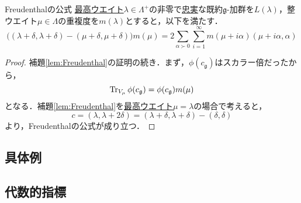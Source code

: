 \documentclass[rep_main]{subfiles}
\begin{document}
\begin{mytheo}[label=thm:Freudenthal]{Freudenthalの公式}
	\hyperref[def:highest-weight-module]{最高ウエイト}$\lambda \in \Lambda^+$の非零で\hyperref[def:faithful]{忠実}な既約$\mathfrak{g}$-加群を$L(\lambda)$，整ウエイト$\mu \in \Lambda$の重複度を$m(\lambda)$とすると，以下を満たす．
	\begin{equation}
		\big((\lambda + \delta, \lambda + \delta) - (\mu + \delta, \mu + \delta)\big)m(\mu) = 2\sum_{\alpha \succ 0}\sum_{i=1}^\infty m(\mu + i\alpha)(\mu + i\alpha, \alpha)
	\end{equation}
\end{mytheo}
\begin{proof}
	補題\ref{lem:Freudenthal}の証明の続き．まず，$\phi(c_\mathfrak{g})$はスカラー倍だったから，
	\begin{equation}
		\Tr_{V_\mu} \phi(c_\mathfrak{g}) = \phi(c_\mathfrak{g})m(\mu)
	\end{equation}
	となる．補題\ref{lem:Freudenthal}を\hyperref[def:highest-weight-module]{最高ウエイト}$\mu = \lambda$の場合で考えると，
	\begin{equation}
		c = (\lambda, \lambda + 2\delta) = (\lambda + \delta, \lambda + \delta) - (\delta, \delta)
	\end{equation}
	より，Freudenthalの公式が成り立つ．
\end{proof}

\subsection{具体例}


\subsection{代数的指標}
\end{document}
